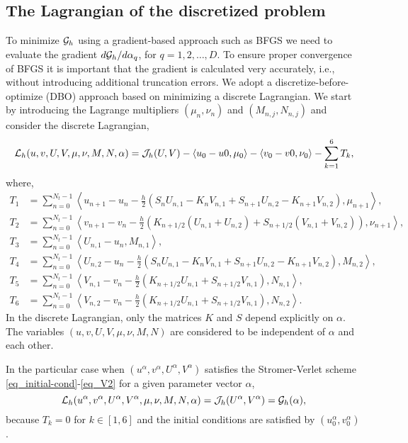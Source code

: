 \documentclass[11pt]{article}
\begin{document}
\subsection{The Lagrangian of the discretized problem}
To minimize ${\cal G}_h$ using a gradient-based approach such as BFGS we need to evaluate the gradient
$d {\cal G}_h/ d\alpha_q$, for $q=1,2,\ldots,D$. To ensure proper convergence of BFGS it is important that the
gradient is calculated very accurately, i.e., without introducing additional truncation errors. We
adopt a discretize-before-optimize (DBO) approach based on minimizing a discrete Lagrangian. We start by
introducing the Lagrange multipliers $(\mu_n,\nu_n)$ and $(M_{n,j}, N_{n,j})$ and consider the discrete Lagrangian,
\begin{equation}\label{eq_disc-Lagrangian}
{\cal L}_h(u,v,U,V, \mu,\nu,M,N,\alpha) = {\cal J}_h(U,V) - \langle u_0 - u0, \mu_0\rangle - \langle
v_0 - v0, \nu_0\rangle - \sum_{k=1}^6 T_k,
\end{equation}
where,
\begin{align}
T_1 &= \sum_{n=0}^{N_t-1} \left\langle u_{n+1} - u_n - \frac{h}{2}\left(S_nU_{n,1} - K_nV_{n,1} + S_{n+1}U_{n,2} - K_{n+1}V_{n,2}
  \right), \mu_{n+1} \right\rangle,\\
T_2 &= \sum_{n=0}^{N_t-1} \left\langle v_{n+1} - v_n - \frac{h}{2}\left(K_{n+1/2} \left(U_{n,1} + U_{n,2}\right) + S_{n+1/2}\left(
  V_{n,1} +  V_{n,2}\right) \right), \nu_{n+1} \right\rangle,\\
T_3 &= \sum_{n=0}^{N_t-1} \left\langle U_{n,1} - u_n, M_{n,1} \right\rangle,\\
T_4 &= \sum_{n=0}^{N_t-1} \left\langle U_{n,2} - u_n - \frac{h}{2}\left(S_nU_{n,1} - K_nV_{n,1} + S_{n+1}U_{n,2} -
  K_{n+1}V_{n,2} \right), M_{n,2} \right\rangle,\\
T_5 &= \sum_{n=0}^{N_t-1} \left\langle V_{n,1} - v_n - \frac{h}{2}\left(  K_{n+1/2} U_{n,1} + S_{n+1/2} V_{n,1} \right), N_{n,1} \right\rangle,\\
T_6 &= \sum_{n=0}^{N_t-1} \left\langle V_{n,2} - v_n - \frac{h}{2}\left(  K_{n+1/2} U_{n,1} + S_{n+1/2} V_{n,1} \right), N_{n,2} \right\rangle.
\end{align}
In the discrete Lagrangian, only the matrices $K$ and $S$ depend explicitly on $\alpha$. The
variables $(u,v,U,V, \mu,\nu,M,N)$ are considered to be independent of $\alpha$ and each
other.

In the particular case when $(u^\alpha,v^\alpha,U^\alpha,V^\alpha)$ satisfies the Stromer-Verlet scheme
\eqref{eq_initial-cond}-\eqref{eq_V2} for a given parameter vector $\alpha$,
\[
{\cal L}_h(u^\alpha,v^\alpha,U^\alpha,V^\alpha, \mu,\nu,M,N,\alpha) = {\cal J}_h(U^\alpha, V^\alpha) = {\cal G}_h(\alpha),
\]
because $T_k=0$ for $k\in[1,6]$ and the initial conditions are satisfied by $(u^\alpha_0, v^\alpha_0)$.
\end{document}
